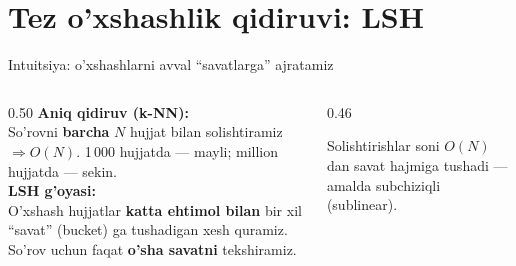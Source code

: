 \documentclass[aspectratio=169,11pt]{beamer}
\begin{document}
\section[Tez qidiruv]{Tez o'xshashlik qidiruvi: LSH}

\begin{frame}{Intuitsiya: o'xshashlarni avval ``savatlarga'' ajratamiz}
  \begin{columns}[T]
    \begin{column}{0.50\textwidth}
      \textbf{Aniq qidiruv (k-NN):}\\[3pt]
      \small
      So'rovni \textbf{barcha} $N$ hujjat bilan solishtiramiz
      $\Rightarrow O(N)$. 1\,000 hujjatda --- mayli; million hujjatda --- sekin.\\[6pt]
      \textbf{LSH g'oyasi:}\\[3pt]
      O'xshash hujjatlar \textbf{katta ehtimol bilan} bir xil ``savat''
      (bucket) ga tushadigan xesh quramiz. So'rov uchun faqat
      \textbf{o'sha savatni} tekshiramiz.
    \end{column}
    \begin{column}{0.46\textwidth}
      \begin{center}
      \end{center}
      \footnotesize\color{halfgray}
      Solishtirishlar soni $O(N)$ dan savat hajmiga tushadi ---
      amalda subchiziqli (sublinear).
    \end{column}
  \end{columns}
\end{frame}
\end{document}
